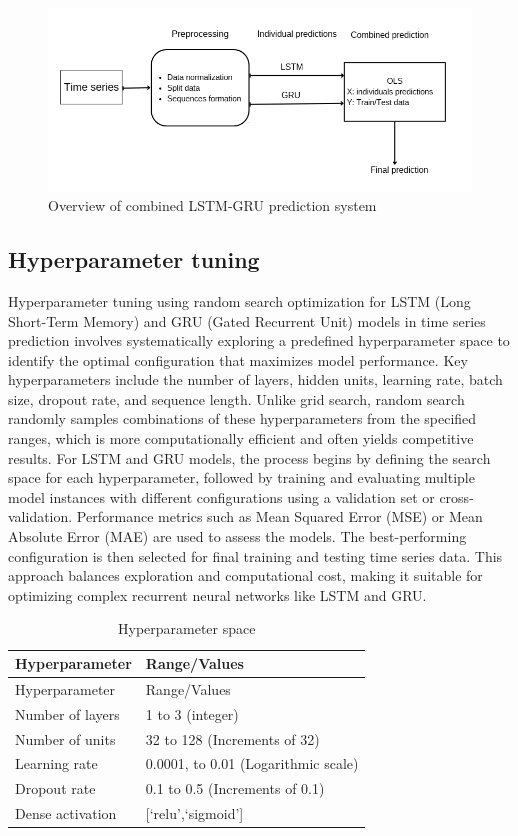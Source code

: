 \documentclass[]{interact}
\theoremstyle{plain}%
\theoremstyle{definition}
\theoremstyle{remark}
\begin{document}
\begin{figure}[H]

{\centering \includegraphics[width=0.95\linewidth]{model} 

}

\caption{Overview of combined LSTM-GRU prediction system}\label{fig:mod}
\end{figure}

\subsection{Hyperparameter tuning}\label{hyperparameter-tuning}

Hyperparameter tuning using random search optimization for LSTM (Long
Short-Term Memory) and GRU (Gated Recurrent Unit) models in time series
prediction involves systematically exploring a predefined hyperparameter
space to identify the optimal configuration that maximizes model
performance. Key hyperparameters include the number of layers, hidden
units, learning rate, batch size, dropout rate, and sequence length.
Unlike grid search, random search randomly samples combinations of these
hyperparameters from the specified ranges, which is more computationally
efficient and often yields competitive results. For LSTM and GRU models,
the process begins by defining the search space for each hyperparameter,
followed by training and evaluating multiple model instances with
different configurations using a validation set or cross-validation.
Performance metrics such as Mean Squared Error (MSE) or Mean Absolute
Error (MAE) are used to assess the models. The best-performing
configuration is then selected for final training and testing time
series data. This approach balances exploration and computational cost,
making it suitable for optimizing complex recurrent neural networks like
LSTM and GRU.

\begin{longtable}[]{@{}ll@{}}
\caption{Hyperparameter space}\tabularnewline
\toprule\noalign{}
Hyperparameter & Range/Values \\
\midrule\noalign{}
\endfirsthead
\toprule\noalign{}
Hyperparameter & Range/Values \\
\midrule\noalign{}
\endhead
\bottomrule\noalign{}
\endlastfoot
Number of layers & 1 to 3 (integer) \\
Number of units & 32 to 128 (Increments of 32) \\
Learning rate & 0.0001, to 0.01 (Logarithmic scale) \\
Dropout rate & 0.1 to 0.5 (Increments of 0.1) \\
Dense activation & {[}`relu',`sigmoid'{]} \\
\end{longtable}
\end{document}
